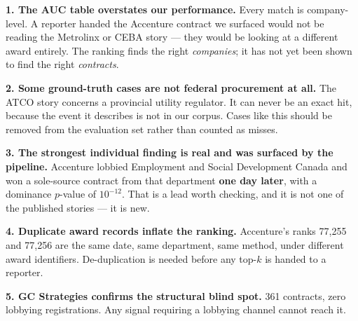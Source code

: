 \documentclass[11pt,a4paper]{article}
\begin{document}
\textbf{1. The AUC table overstates our performance.} Every match is company-level. A
reporter handed the Accenture contract we surfaced would not be reading the Metrolinx or
CEBA story --- they would be looking at a different award entirely. The ranking finds the
right \emph{companies}; it has not yet been shown to find the right \emph{contracts}.

\textbf{2. Some ground-truth cases are not federal procurement at all.} The ATCO story
concerns a provincial utility regulator. It can never be an exact hit, because the event
it describes is not in our corpus. Cases like this should be removed from the evaluation
set rather than counted as misses.

\textbf{3. The strongest individual finding is real and was surfaced by the pipeline.}
Accenture lobbied Employment and Social Development Canada and won a sole-source contract
from that department \textbf{one day later}, with a dominance $p$-value of $10^{-12}$.
That is a lead worth checking, and it is not one of the published stories --- it is new.

\textbf{4. Duplicate award records inflate the ranking.} Accenture's ranks 77{,}255 and
77{,}256 are the same date, same department, same method, under different award
identifiers. De-duplication is needed before any top-$k$ is handed to a reporter.

\textbf{5. GC Strategies confirms the structural blind spot.} 361 contracts, zero
lobbying registrations. Any signal requiring a lobbying channel cannot reach it.
\end{document}
